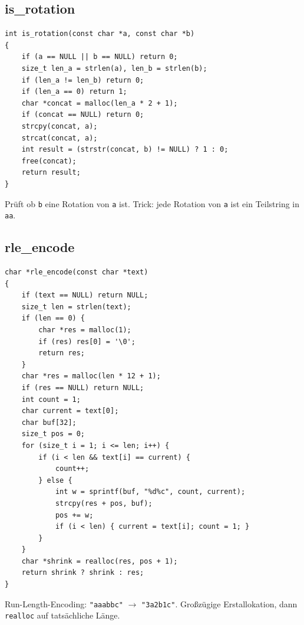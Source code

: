 \documentclass[10pt, a4paper]{article}
\begin{document}
\subsection{is\_rotation}
\begin{lstlisting}
int is_rotation(const char *a, const char *b)
{
    if (a == NULL || b == NULL) return 0;
    size_t len_a = strlen(a), len_b = strlen(b);
    if (len_a != len_b) return 0;
    if (len_a == 0) return 1;
    char *concat = malloc(len_a * 2 + 1);
    if (concat == NULL) return 0;
    strcpy(concat, a);
    strcat(concat, a);
    int result = (strstr(concat, b) != NULL) ? 1 : 0;
    free(concat);
    return result;
}
\end{lstlisting}
Pr\"uft ob \texttt{b} eine Rotation von \texttt{a} ist. Trick: jede Rotation von \texttt{a} ist ein Teilstring in \texttt{aa}.

\subsection{rle\_encode}
\begin{lstlisting}
char *rle_encode(const char *text)
{
    if (text == NULL) return NULL;
    size_t len = strlen(text);
    if (len == 0) {
        char *res = malloc(1);
        if (res) res[0] = '\0';
        return res;
    }
    char *res = malloc(len * 12 + 1);
    if (res == NULL) return NULL;
    int count = 1;
    char current = text[0];
    char buf[32];
    size_t pos = 0;
    for (size_t i = 1; i <= len; i++) {
        if (i < len && text[i] == current) {
            count++;
        } else {
            int w = sprintf(buf, "%d%c", count, current);
            strcpy(res + pos, buf);
            pos += w;
            if (i < len) { current = text[i]; count = 1; }
        }
    }
    char *shrink = realloc(res, pos + 1);
    return shrink ? shrink : res;
}
\end{lstlisting}
Run-Length-Encoding: \texttt{"aaabbc"} $\to$ \texttt{"3a2b1c"}. Gro\ss z\"ugige Erstallokation, dann \texttt{realloc} auf tats\"achliche L\"ange.
\end{document}
